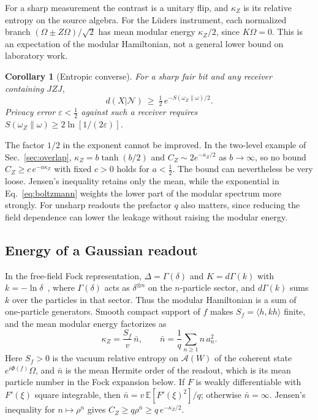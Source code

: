 \documentclass[11pt,a4paper]{article}
\newtheorem{corollary}[theorem]{Corollary}
\newcommand{\N}{\mathcal N}
\newcommand{\A}{\mathcal A}
\newcommand{\E}{\mathbb E}
\begin{document}
For a sharp measurement the contrast is a unitary flip, and $\kappa_Z$ is its relative entropy on the source algebra. For the L\"uders instrument, each normalized branch $(\Omega\pm Z\Omega)/\sqrt2$ has mean modular energy $\kappa_Z/2$, since $K\Omega=0$. This is an expectation of the modular Hamiltonian, not a general lower bound on laboratory work.

\begin{corollary}[Entropic converse]
\label{cor:converse}
For a sharp fair bit and any receiver containing $JZJ$,
\begin{equation}
 d(X|\N)\ \ge\ \tfrac12\,e^{-S(\omega_Z\|\omega)/2} .
 \label{eq:converse}
\end{equation}
Privacy error $\varepsilon<\tfrac12$ against such a receiver requires $S(\omega_Z\|\omega)\ge2\ln[1/(2\varepsilon)]$.
\end{corollary}

The factor $1/2$ in the exponent cannot be improved. In the two-level example of Sec.~\ref{sec:overlap}, $\kappa_Z=b\tanh(b/2)$ and $C_Z\sim2e^{-\kappa_Z/2}$ as $b\to\infty$, so no bound $C_Z\ge c\,e^{-a\kappa_Z}$ with fixed $c>0$ holds for $a<\tfrac12$. The bound can nevertheless be very loose. Jensen's inequality retains only the mean, while the exponential in Eq.~\eqref{eq:boltzmann} weights the lower part of the modular spectrum more strongly. For unsharp readouts the prefactor $q$ also matters, since reducing the field dependence can lower the leakage without raising the modular energy.

\subsection{Energy of a Gaussian readout}

In the free-field Fock representation, $\Delta=\Gamma(\delta)$ and $K=d\Gamma(k)$ with $k=-\ln\delta$~\cite{eckmann1973application}, where $\Gamma(\delta)$ acts as $\delta^{\otimes n}$ on the $n$-particle sector, and $d\Gamma(k)$ sums $k$ over the particles in that sector. Thus the modular Hamiltonian is a sum of one-particle generators. Smooth compact support of $f$ makes $S_f=\langle h,kh\rangle$ finite, and the mean modular energy factorizes as
\begin{equation}
 \kappa_Z=\frac{S_f}{v}\,\bar n,\qquad \bar n=\frac1q\sum_{n\ge1}n\,a_n^2 .
 \label{eq:factor}
\end{equation}
Here $S_f>0$ is the vacuum relative entropy on $\A(W)$ of the coherent state $e^{i\Phi(f)}\Omega$, and $\bar n$ is the mean Hermite order of the readout, which is its mean particle number in the Fock expansion below. If $F$ is weakly differentiable with $F'(\xi)$ square integrable, then $\bar n=v\,\E[F'(\xi)^2]/q$; otherwise $\bar n=\infty$. Jensen's inequality for $n\mapsto\rho^n$ gives $C_Z\ge q\rho^{\bar n}\ge q\,e^{-\kappa_Z/2}$.
\end{document}
